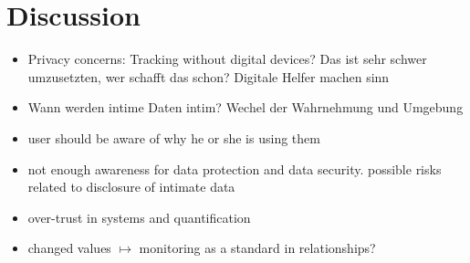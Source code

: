 \section{Discussion}
\begin{itemize}
	\item Privacy concerns: Tracking without digital devices?
	Das ist sehr schwer umzusetzten, wer schafft das schon? Digitale Helfer machen sinn
	\item Wann werden intime Daten intim? Wechel der Wahrnehmung und Umgebung
	\item user should be aware of why he or she is using them
	\item not enough awareness for data protection and data security. possible risks related to disclosure of intimate data
	\item over-trust in systems and quantification
	\item changed values $\mapsto $ monitoring as a standard in relationships?
\end{itemize}
